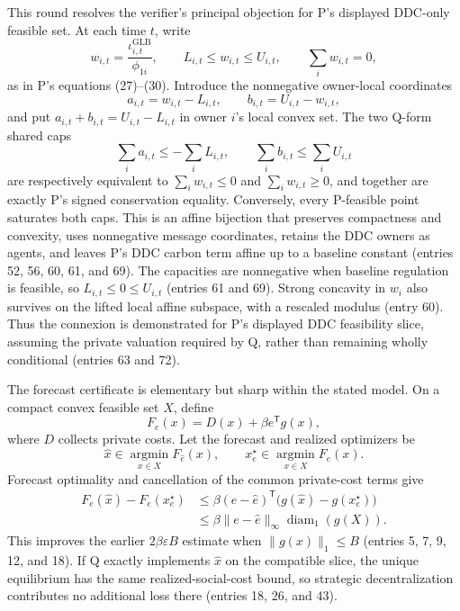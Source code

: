 \documentclass{article}
\begin{document}
This round resolves the verifier's principal objection for P's displayed
DDC-only feasible set.  At each time \(t\), write
\[
 w_{i,t}=\frac{\iota^{\mathrm{GLB}}_{i,t}}{\phi_{1i}},
 \qquad L_{i,t}\leq w_{i,t}\leq U_{i,t},
 \qquad \sum_i w_{i,t}=0,
\]
as in P's equations (27)--(30).  Introduce the nonnegative owner-local
coordinates
\[
 a_{i,t}=w_{i,t}-L_{i,t},\qquad
 b_{i,t}=U_{i,t}-w_{i,t},
\]
and put \(a_{i,t}+b_{i,t}=U_{i,t}-L_{i,t}\) in owner \(i\)'s local convex
set.  The two Q-form shared caps
\[
 \sum_i a_{i,t}\leq-\sum_iL_{i,t},\qquad
 \sum_i b_{i,t}\leq\sum_iU_{i,t}
\]
are respectively equivalent to \(\sum_iw_{i,t}\leq0\) and
\(\sum_iw_{i,t}\geq0\), and together are exactly P's signed conservation
equality.  Conversely, every P-feasible point saturates both caps.  This is
an affine bijection that preserves compactness and convexity, uses
nonnegative message coordinates, retains the DDC owners as agents, and
leaves P's DDC carbon term affine up to a baseline constant (entries 52, 56,
60, 61, and 69).  The capacities are nonnegative when baseline regulation is
feasible, so \(L_{i,t}\leq0\leq U_{i,t}\) (entries 61 and 69).  Strong
concavity in \(w_i\) also survives on the lifted local affine subspace, with
a rescaled modulus (entry 60).  Thus the connexion is demonstrated for P's
displayed DDC feasibility slice, assuming the private valuation required by
Q, rather than remaining wholly conditional (entries 63 and 72).

The forecast certificate is elementary but sharp within the stated model.
On a compact convex feasible set \(X\), define
\[
 F_e(x)=D(x)+\beta e^{\mathsf T}g(x),
\]
where \(D\) collects private costs.  Let the forecast and realized optimizers
be
\[
 \widehat x\in\operatorname*{argmin}_{x\in X}F_{\widehat e}(x),
 \qquad
 x_e^\star\in\operatorname*{argmin}_{x\in X}F_e(x).
\]
Forecast optimality and cancellation of the common private-cost terms give
\begin{align*}
 F_e(\widehat x)-F_e(x_e^\star)
 &\leq \beta(e-\widehat e)^{\mathsf T}
       \bigl(g(\widehat x)-g(x_e^\star)\bigr)\\
 &\leq \beta\lVert e-\widehat e\rVert_\infty
       \operatorname{diam}_1(g(X)).
\end{align*}
This improves the earlier \(2\beta\varepsilon B\) estimate when
\(\lVert g(x)\rVert_1\leq B\) (entries 5, 7, 9, 12, and 18).  If Q exactly
implements \(\widehat x\) on the compatible slice, the unique equilibrium has
the same realized-social-cost bound, so strategic decentralization contributes
no additional loss there (entries 18, 26, and 43).
\end{document}
